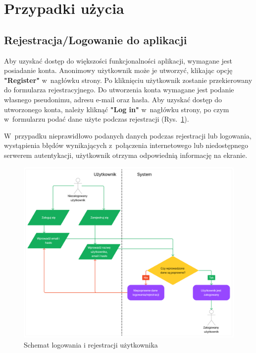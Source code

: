 \FloatBarrier

\section{Przypadki użycia}

\subsection{Rejestracja/Logowanie do aplikacji}

Aby uzyskać dostęp do większości funkcjonalności aplikacji, wymagane
jest posiadanie konta. Anonimowy użytkownik może je utworzyć, klikając
opcję \textbf{"Register"} w~nagłówku strony. Po kliknięciu użytkownik
zostanie przekierowany do formularza rejestracyjnego.
Do utworzenia konta wymagane jest podanie własnego
pseudonimu, adresu e-mail oraz hasła. Aby uzyskać dostęp do utworzonego
konta, należy kliknąć \textbf{"Log in"} w~nagłówku strony, po czym
w~formularzu podać dane użyte podczas rejestracji (Rys.~\ref{fig:schemat_login}).

W~przypadku nieprawidłowo podanych danych podczas rejestracji
lub logowania, wystąpienia błędów wynikających z~połączenia internetowego lub
niedostępnego serwerem autentykacji, użytkownik otrzyma odpowiednią
informację na ekranie.

\begin{figure}[h]
  \centering
  \includegraphics[width=\textwidth]{img/schematy/login.png}
  \caption{Schemat logowania i rejestracji użytkownika}
  \label{fig:schemat_login}
\end{figure}

